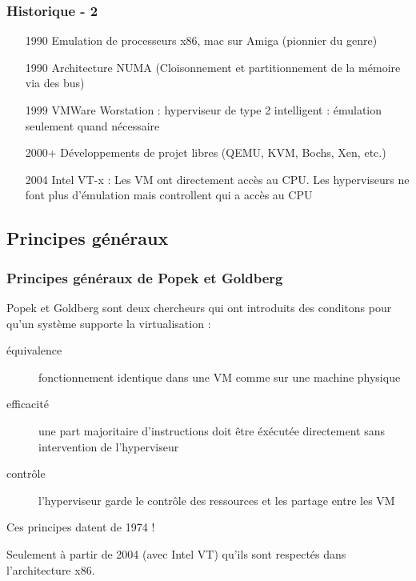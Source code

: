   \begin{frame}
    \frametitle{Historique - 2}
    \begin{itemize}
      \item[1990] Emulation de processeurs x86, mac sur Amiga (pionnier du genre)\pause
      \item[1990] Architecture NUMA (Cloisonnement et partitionnement de la mémoire via des bus)
      \pause
      \item[1999] VMWare Worstation : hyperviseur de type 2 intelligent : émulation seulement quand nécessaire\pause
      \item[2000+] Développements de projet libres (QEMU, KVM, Bochs, Xen, etc.)\pause
      \item[2004] Intel VT-x : Les VM ont directement accès au CPU. Les hyperviseurs ne font plus d'émulation mais controllent qui a accès au CPU
      \pause
    \end{itemize}
  \end{frame}
  
  \subsection{Principes généraux}
  
  \begin{frame}
    \frametitle{Principes généraux de Popek et Goldberg}
    Popek et Goldberg sont deux chercheurs qui ont introduits des conditons pour qu'un système supporte la virtualisation :
    \begin{description}
      \item[équivalence] fonctionnement identique dans une VM comme sur une machine physique
      \item[efficacité] une part majoritaire d'instructions doit être éxécutée directement sans intervention de l'hyperviseur
      \item[contrôle] l'hyperviseur garde le contrôle des ressources et les partage entre les VM\pause
    \end{description}
    \alert{Ces principes datent de 1974 !}
    
    Seulement à partir de 2004 (avec Intel VT) qu'ils sont respectés dans l'architecture x86.
  \end{frame}
  
